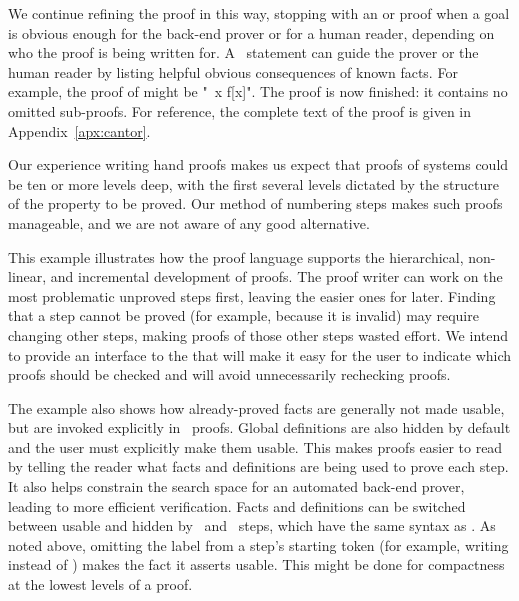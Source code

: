 \documentclass[a4paper]{easychair}
\begin{document}
We continue refining the proof in this way, stopping 
with an \OBVIOUS or \BY proof when a goal is
obvious enough for the back-end prover or for a human reader,
depending on who the proof is being written for. 
A \BY\ statement can guide the prover or the human reader
by listing helpful obvious consequences of known facts.  
For example, the proof of  might be "\BY\ x \notin f[x]".
The proof is now finished: it contains no omitted sub-proofs.  For
reference, the complete text of the proof is given in
Appendix~\ref{apx:cantor}.

Our experience writing hand proofs makes us expect that proofs of
systems could be ten or more levels deep, with the first several
levels dictated by the structure of the property to be proved.  
Our method of numbering steps makes such proofs manageable, and we are
not aware of any good alternative.

This example illustrates how the proof language supports the
hierarchical, non-linear, and incremental development of proofs.  The
proof writer can work on the most problematic unproved steps first,
leaving the easier ones for later.  Finding that a step cannot be
proved (for example, because it is invalid) may require changing other
steps, making proofs of those other steps wasted effort.  We intend to
provide an interface to the \PM that will make it easy for the user
to indicate which proofs should be checked and will avoid
unnecessarily rechecking proofs.

The example also shows how already-proved facts are generally not made
usable, but are invoked explicitly in \BY\ proofs.  Global definitions
are also hidden by default and the user must explicitly make them
usable.  This makes proofs easier to read by telling the reader what
facts and definitions are being used to prove each step.  It also
helps constrain the search space for an automated back-end prover,
leading to more efficient verification.  Facts and definitions can be
switched between usable and hidden by \USE\ and \HIDE\ steps, which
have the same syntax as \BY. As noted above, omitting the label from a
step's starting token (for example, writing  instead of ) makes
the fact it asserts usable.  This might be done for compactness at
the lowest levels of a proof.
\end{document}
